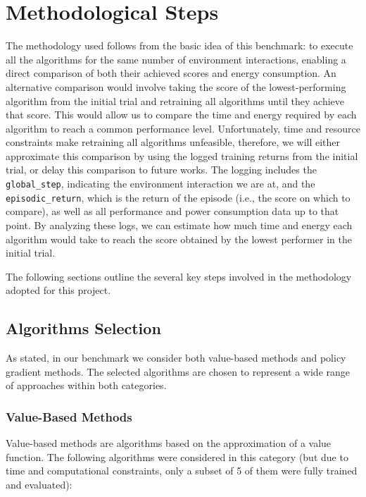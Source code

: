 \section[Methodological Steps]{Methodological Steps}
\label{sec:methodologies}

The methodology used follows from the basic idea of this benchmark: to execute all the algorithms for the same number of environment interactions, enabling a direct comparison of both their achieved scores and energy consumption.
An alternative comparison would involve taking the score of the lowest-performing algorithm from the initial trial and retraining all algorithms until they achieve that score. This would allow us to compare the time and energy required by each algorithm to reach a common performance level. Unfortunately, time and resource constraints make retraining all algorithms unfeasible, therefore, we will either approximate this comparison by using the logged training returns from the initial trial, or delay this comparison to future works. The logging includes the \verb*|global_step|, indicating the environment interaction we are at, and the \verb*|episodic_return|, which is the return of the episode (i.e., the score on which to compare), as well as all performance and power consumption data up to that point. By analyzing these logs, we can estimate how much time and energy each algorithm would take to reach the score obtained by the lowest performer in the initial trial. 

The following sections outline the several key steps involved in the methodology adopted for this project.

\subsection{Algorithms Selection}
\label{subsec:algorithm_selection}

As stated, in our benchmark we consider both value-based methods and policy gradient methods. The selected algorithms are chosen to represent a wide range of approaches within both categories.

\subsubsection{Value-Based Methods}

Value-based methods are algorithms based on the approximation of a value function. The following algorithms were considered in this category (but due to time and computational constraints, only a subset of 5 of them were fully trained and evaluated):

